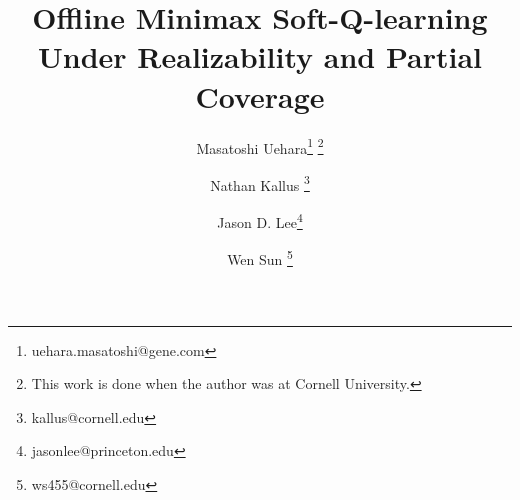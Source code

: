 \documentclass[12pt]{article} %
\begin{document}
\title{Offline Minimax Soft-Q-learning Under Realizability and Partial Coverage }
\author[1]{Masatoshi Uehara\thanks{uehara.masatoshi@gene.com} \footnote{This work is done when the author was at Cornell University.}} 
\author[1]{Nathan Kallus \thanks{kallus@cornell.edu}}
\author[2]{Jason D. Lee\thanks{jasonlee@princeton.edu  }}
\author[1]{Wen Sun \thanks{ws455@cornell.edu}}

\date{}

\maketitle

\begin{abstract}
 
\end{abstract}

\vspace{-0.8cm}

\vspace{-0.15cm}


 

 
















\appendix 





\end{document}
